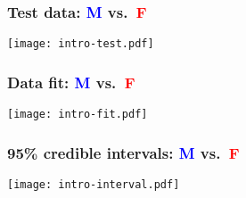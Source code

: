 \documentclass[11pt,dvipsnames,usenames,times]{beamer}
\begin{document}
\begin{frame}\frametitle{Test data: \textcolor{blue}{M} vs.\ \textcolor{red}{F}}
\begin{center}
\texttt{[image: intro-test.pdf]}
\end{center}
\end{frame}

\begin{frame}\frametitle{Data fit: \textcolor{blue}{M} vs.\ \textcolor{red}{F}}
\begin{center}
\texttt{[image: intro-fit.pdf]}
\end{center}
\end{frame}

\begin{frame}\frametitle{95\% credible intervals: \textcolor{blue}{M} vs.\ \textcolor{red}{F}}
\begin{center}
\texttt{[image: intro-interval.pdf]}
\end{center}
\end{frame}
\end{document}

